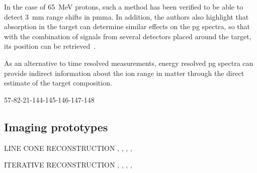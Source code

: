 In the case of 65~MeV protons, such a method has been verified to be able to detect 3~mm range shifts in \gls{pmma}. In addition, the authors also highlight that absorption in the target can determine similar effects on the \gls{pg} spectra, so that with the combination of signals from several detectors placed around the target, its position can be retrieved~\parencite{Krimmer2017b}.

As an alternative to time resolved measurements, energy resolved \gls{pg} spectra can provide indirect information about the ion range in matter through the direct estimate of the target composition.


\parencite{Verburg2012, Verburg2013, Verburg2014, Testa2014, Verburg2015, Polf2009, Polf2009b, Polf2013} 57-82-21-144-145-146-147-148

\subsection{Imaging prototypes}\label{chap2::subsec::PGdevices_Imaging}



LINE CONE RECONSTRUCTION \parencite{Cree1994}, \parencite{Basko1998}, \parencite{Parra1999}, \parencite{Hirasawa2003}, \parencite{Maxim2009} 

ITERATIVE RECONSTRUCTION \parencite{Schone2010}, \parencite{Zoglauer2011}, \parencite{Gillam2011}, \parencite{Lojacono2013}, \parencite{Mackin2012}

\clearpage
